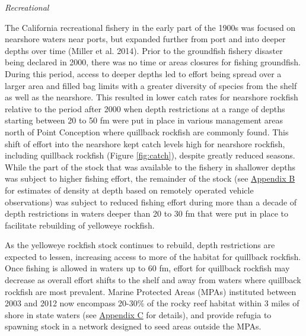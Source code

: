 \documentclass[11pt,
  english,
  letterpaper,
]{article}
\begin{document}
\leavevmode\tagmcend\tagstructend\par


\emph{Recreational}

\leavevmode\tagmcend\tagstructend\par


The California recreational fishery in the early part of the 1900s was focused on nearshore waters near ports, but expanded further from port and into deeper depths over time {(Miller et al. 2014)\leavevmode\tagmcend\tagstructend}. Prior to the groundfish fishery disaster being declared in 2000, there was no time or areas closures for fishing groundfish. During this period, access to deeper depths led to effort being spread over a larger area and filled bag limits with a greater diversity of species from the shelf as well as the nearshore. This resulted in lower catch rates for nearshore rockfish relative to the period after 2000 when depth restrictions at a range of depths starting between 20 to 50 fm were put in place in various management areas north of Point Conception where quillback rockfish are commonly found. This shift of effort into the nearshore kept catch levels high for nearshore rockfish, including quillback rockfish (Figure \ref{fig:catch}), despite greatly reduced seasons. While the part of the stock that was available to the fishery in shallower depths was subject to higher fishing effort, the remainder of the stock (see {\protect\hyperlink{append_b}{Appendix B}\leavevmode\tagmcend\tagstructend} for estimates of density at depth based on remotely operated vehicle observations) was subject to reduced fishing effort during more than a decade of depth restrictions in waters deeper than 20 to 30 fm that were put in place to facilitate rebuilding of yelloweye rockfish.

\leavevmode\tagmcend\tagstructend\par


As the yelloweye rockfish stock continues to rebuild, depth restrictions are expected to lessen, increasing access to more of the habitat for quillback rockfish. Once fishing is allowed in waters up to 60 fm, effort for quillback rockfish may decrease as overall effort shifts to the shelf and away from waters where quillback rockfish are most prevalent. Marine Protected Areas (MPAs) instituted between 2003 and 2012 now encompass 20-30\% of the rocky reef habitat within 3 miles of shore in state waters (see {\protect\hyperlink{append_c}{Appendix C}\leavevmode\tagmcend\tagstructend} for details), and provide refugia to spawning stock in a network designed to seed areas outside the MPAs.
\end{document}
